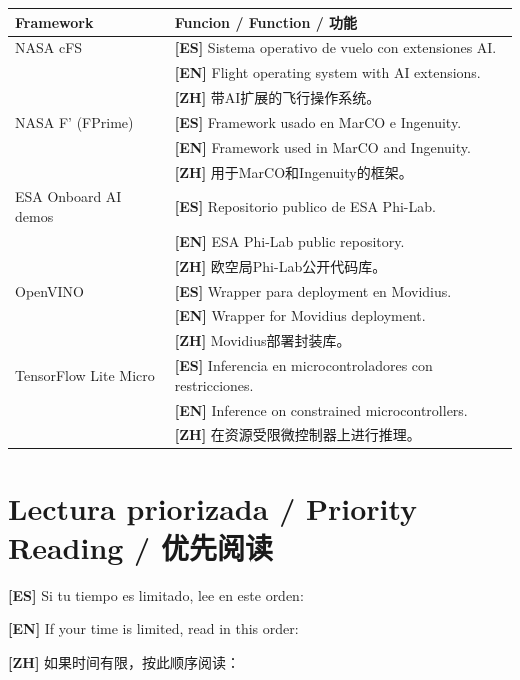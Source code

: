 \documentclass[11pt,a4paper]{report}
\begin{document}
\begin{center}
\small
\begin{longtable}{p{3.5cm}p{10cm}}
\toprule
\textbf{Framework} &
\textbf{Funcion / Function / 功能} \\
\midrule
\endhead
NASA cFS &
\textbf{[ES]} Sistema operativo de vuelo con extensiones AI. \\
&\textbf{[EN]} Flight operating system with AI extensions. \\
&\textbf{[ZH]} 带AI扩展的飞行操作系统。 \\
\midrule
NASA F' (FPrime) &
\textbf{[ES]} Framework usado en MarCO e Ingenuity. \\
&\textbf{[EN]} Framework used in MarCO and Ingenuity. \\
&\textbf{[ZH]} 用于MarCO和Ingenuity的框架。 \\
\midrule
ESA Onboard AI demos &
\textbf{[ES]} Repositorio publico de ESA Phi-Lab. \\
&\textbf{[EN]} ESA Phi-Lab public repository. \\
&\textbf{[ZH]} 欧空局Phi-Lab公开代码库。 \\
\midrule
OpenVINO &
\textbf{[ES]} Wrapper para deployment en Movidius. \\
&\textbf{[EN]} Wrapper for Movidius deployment. \\
&\textbf{[ZH]} Movidius部署封装库。 \\
\midrule
TensorFlow Lite Micro &
\textbf{[ES]} Inferencia en microcontroladores con restricciones. \\
&\textbf{[EN]} Inference on constrained microcontrollers. \\
&\textbf{[ZH]} 在资源受限微控制器上进行推理。 \\
\bottomrule
\end{longtable}
\end{center}

\chapter{Lectura priorizada / Priority Reading / 优先阅读}

\noindent\textbf{[ES]} Si tu tiempo es limitado, lee en este orden:

\noindent\textbf{[EN]} If your time is limited, read in this order:

\noindent\textbf{[ZH]} 如果时间有限，按此顺序阅读：
\end{document}
